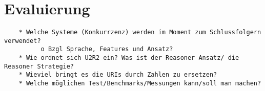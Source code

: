 \chapter{Evaluierung}

\begin{verbatim}
    * Welche Systeme (Konkurrzenz) werden im Moment zum Schlussfolgern verwendet?
          o Bzgl Sprache, Features und Ansatz? 
    * Wie ordnet sich U2R2 ein? Was ist der Reasoner Ansatz/ die Reasoner Strategie?
    * Wieviel bringt es die URIs durch Zahlen zu ersetzen?
    * Welche möglichen Test/Benchmarks/Messungen kann/soll man machen? 
\end{verbatim}
